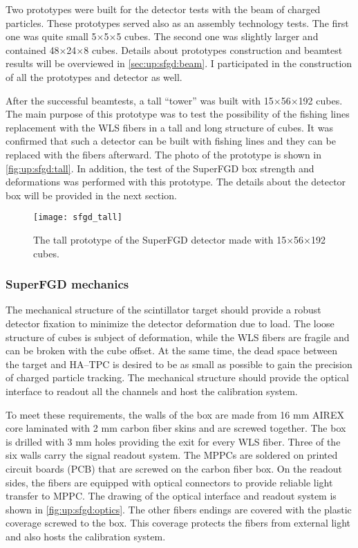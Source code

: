 \documentclass[main.tex]{subfiles}
\begin{document}
Two prototypes were built for the detector tests with the beam of charged particles. These prototypes served also as an assembly technology tests. The first one was quite small 5$\times$5$\times$5 cubes. The second one was slightly larger and contained 48$\times$24$\times$8 cubes. Details about prototypes construction and beamtest results will be overviewed in \autoref{sec:up:sfgd:beam}. I participated in the construction of all the prototypes and detector as well. 

After the successful beamtests, a tall ``tower'' was built with 15$\times$56$\times$192 cubes. The main purpose of this prototype was to test the possibility of the fishing lines replacement with the WLS fibers in a tall and long structure of cubes. It was confirmed that such a detector can be built with fishing lines and they can be replaced with the fibers afterward. The photo of the prototype is shown in \autoref{fig:up:sfgd:tall}. In addition, the test of the SuperFGD box strength and deformations was performed with this prototype. The details about the detector box will be provided in the next section.

\begin{figure}[!ht]
	\centering
	\texttt{[image: sfgd\_tall]}
	\caption{The tall prototype of the SuperFGD detector made with 15$\times$56$\times$192 cubes.}
	\label{fig:up:sfgd:tall}
\end{figure}

\subsubsection{SuperFGD mechanics}
The mechanical structure of the scintillator target should provide a robust detector fixation to minimize the detector deformation due to load. The loose structure of cubes is subject of deformation, while the WLS fibers are fragile and can be broken with the cube offset. At the same time, the dead space between the target and HA--TPC is desired to be as small as possible to gain the precision of charged particle tracking. The mechanical structure should provide the optical interface to readout all the channels and host the calibration system.

To meet these requirements, the walls of the box are made from 16 mm AIREX core laminated with 2 mm carbon fiber skins and are screwed together. The box is drilled with 3 mm holes providing the exit for every WLS fiber. Three of the six walls carry the signal readout system. The MPPCs are soldered on printed circuit boards (PCB) that are screwed on the carbon fiber box. On the readout sides, the fibers are equipped with optical connectors to provide reliable light transfer to MPPC. The drawing of the optical interface and readout system is shown in \autoref{fig:up:sfgd:optics}. The other fibers endings are covered with the plastic coverage screwed to the box. This coverage protects the fibers from external light and also hosts the calibration system.
\end{document}
